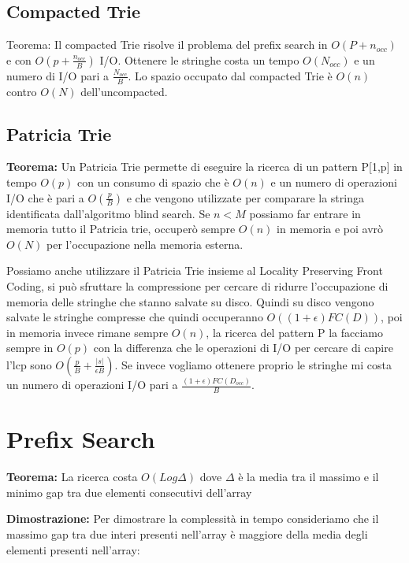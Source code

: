 \documentclass[12pt]{article}
\begin{document}
\subsection{Compacted Trie}


Teorema: Il compacted Trie risolve il problema del prefix search in $O(P+n_{occ})$ e con $O(p+\frac{n_{occ}}{B})$ I/O.
Ottenere le stringhe costa un tempo $O(N_{occ})$ e un numero di I/O pari a $\frac{N_{occ}}{B}$. Lo spazio occupato dal compacted Trie è $O(n)$ contro $O(N)$ dell'uncompacted.


\subsection{Patricia Trie}


\textbf{Teorema:} Un Patricia Trie permette di eseguire la ricerca di un pattern P[1,p] in tempo $O(p)$ con un consumo di spazio che è $O(n)$ e un numero di operazioni I/O che è pari a $O(\frac{p}{B})$ e che vengono utilizzate per comparare la stringa identificata dall'algoritmo blind search.
Se $n<M$ possiamo far entrare in memoria tutto il Patricia trie, occuperò sempre $O(n)$ in memoria e poi avrò $O(N)$ per l'occupazione nella memoria esterna.


Possiamo anche utilizzare il Patricia Trie insieme al Locality Preserving Front Coding, si può sfruttare la compressione per cercare di ridurre l'occupazione di memoria delle stringhe che stanno salvate su disco.
Quindi su disco vengono salvate le stringhe compresse che quindi occuperanno $O((1+\epsilon)FC(D))$, poi in memoria invece rimane sempre $O(n)$, la ricerca del pattern P la facciamo sempre in $O(p)$ con la differenza che le operazioni di I/O per cercare di capire l'lcp sono $O(\frac{p}{B} + \frac{|s|}{\epsilon B})$. Se invece vogliamo ottenere proprio le stringhe mi costa un numero di operazioni I/O pari a $\frac{(1+\epsilon)FC(D_{occ})}{B}$.


\section{Prefix Search}

\textbf{Teorema:} La ricerca costa $O(Log \Delta)$ dove $\Delta$ è la media tra il massimo e il minimo gap tra due elementi consecutivi dell'array

\textbf{Dimostrazione:} Per dimostrare la complessità in tempo consideriamo che il massimo gap tra due interi presenti nell'array è maggiore della media degli elementi presenti nell'array:
\end{document}
